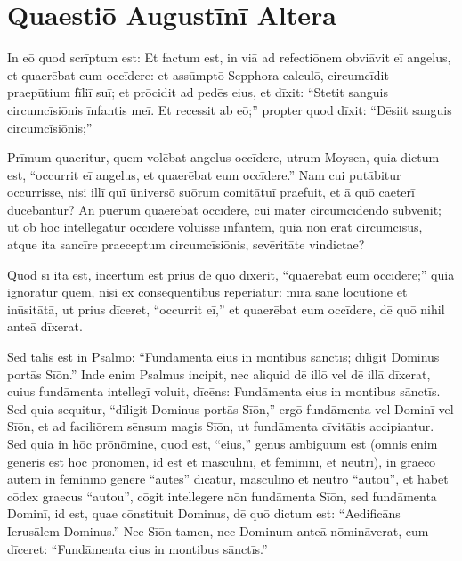 \section{Quaestiō Augustīnī Altera}

In eō quod scrīptum est: Et factum est, in viā ad refectiōnem obviāvit
eī angelus, et quaerēbat eum occīdere: et assūmptō Sepphora calculō,
circumcīdit praepūtium fīliī suī; et prōcidit ad pedēs eius, et dīxit:
``Stetit sanguis circumcīsiōnis īnfantis meī. Et recessit ab eō;'' propter
quod dīxit: ``Dēsiit sanguis circumcīsiōnis;'' 

Prīmum quaeritur, quem
volēbat angelus occīdere, utrum Moysen, quia dictum est, ``occurrit eī
angelus, et quaerēbat eum occīdere.'' Nam cui putābitur occurrisse, nisi
illī quī ūniversō suōrum comitātuī praefuit, et ā quō caeterī
dūcēbantur? An puerum quaerēbat occīdere, cui māter circumcīdendō
subvenit; ut ob hoc intellegātur occīdere voluisse īnfantem, quia nōn
erat circumcīsus, atque ita sancīre praeceptum circumcīsiōnis,
sevēritāte vindictae?

Quod sī ita est, incertum est prius dē quō
dīxerit, ``quaerēbat eum occīdere;'' quia ignōrātur quem, nisi ex
cōnsequentibus reperiātur: mīrā sānē locūtiōne et inūsitātā, ut prius
dīceret, ``occurrit eī,'' et quaerēbat eum occīdere, dē quō nihil anteā
dīxerat.

Sed tālis est in Psalmō: ``Fundāmenta eius in montibus sānctīs;
dīligit Dominus portās Sīōn.'' Inde enim Psalmus incipit, nec aliquid
dē illō vel dē illā dīxerat, cuius fundāmenta intellegī voluit, dīcēns:
Fundāmenta eius in montibus sānctīs. Sed quia sequitur, ``dīligit Dominus
portās Sīōn,'' ergō fundāmenta vel Dominī vel Sīōn, et ad faciliōrem
sēnsum magis Sīōn, ut fundāmenta cīvitātis accipiantur. Sed quia in hōc
prōnōmine, quod est, ``eius,'' genus ambiguum est (omnis enim generis est
hoc prōnōmen, id est et masculīnī, et fēminīnī, et neutrī), in graecō
autem in fēminīnō genere ``autes'' dīcātur, masculīnō et neutrō
``autou'', et habet cōdex
graecus ``autou'', cōgit intellegere nōn fundāmenta Sīōn, sed fundāmenta Dominī,
id est, quae cōnstituit Dominus, dē quō dictum est: ``Aedificāns Ierusālem
Dominus.'' Nec Sīōn tamen, nec Dominum anteā nōmināverat, cum dīceret:
``Fundāmenta eius in montibus sānctīs.'' 

